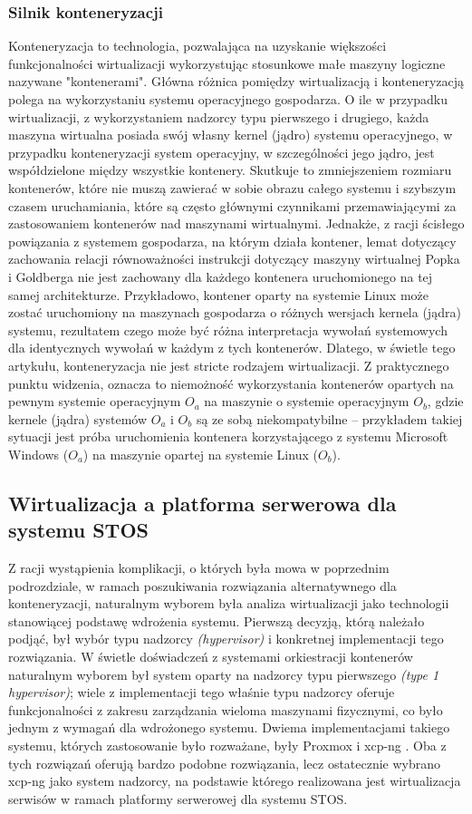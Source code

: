 \subsubsection{Silnik konteneryzacji}
Konteneryzacja to technologia, pozwalająca na uzyskanie większości funkcjonalności wirtualizacji wykorzystując stosunkowe małe maszyny logiczne nazywane "kontenerami". Główna różnica pomiędzy wirtualizacją i konteneryzacją polega na wykorzystaniu systemu operacyjnego gospodarza. O ile w przypadku wirtualizacji, z wykorzystaniem nadzorcy typu pierwszego i drugiego, każda maszyna wirtualna posiada swój własny kernel (jądro) systemu operacyjnego, w przypadku konteneryzacji system operacyjny, w szczególności jego jądro, jest współdzielone między wszystkie kontenery. Skutkuje to zmniejszeniem rozmiaru kontenerów, które nie muszą zawierać w sobie obrazu całego systemu i szybszym czasem uruchamiania, które są często głównymi czynnikami przemawiającymi za zastosowaniem kontenerów nad maszynami wirtualnymi. Jednakże, z racji ścisłego powiązania z systemem gospodarza, na którym działa kontener, lemat dotyczący zachowania relacji równoważności instrukcji dotyczący maszyny wirtualnej Popka i Goldberga \cite{virtualization} nie jest zachowany dla każdego kontenera uruchomionego na tej samej architekturze. Przykładowo, kontener oparty na systemie Linux może zostać uruchomiony na maszynach gospodarza o różnych wersjach kernela (jądra) systemu, rezultatem czego może być różna interpretacja wywołań systemowych dla identycznych wywołań w każdym z tych kontenerów. Dlatego, w świetle tego artykułu, konteneryzacja nie jest stricte rodzajem wirtualizacji. Z praktycznego punktu widzenia, oznacza to niemożność wykorzystania kontenerów opartych na pewnym systemie operacyjnym $O_a$ na maszynie o systemie operacyjnym $O_b$, gdzie kernele (jądra) systemów $O_a$ i $O_b$ są ze sobą niekompatybilne -- przykładem takiej sytuacji jest próba uruchomienia kontenera korzystającego z systemu Microsoft Windows ($O_a$) na maszynie opartej na systemie Linux ($O_b$).

\subsection{Wirtualizacja a platforma serwerowa dla systemu STOS}
Z racji wystąpienia komplikacji, o których była mowa w poprzednim podrozdziale, w ramach poszukiwania rozwiązania alternatywnego dla konteneryzacji, naturalnym wyborem była analiza wirtualizacji jako technologii stanowiącej podstawę wdrożenia systemu. Pierwszą decyzją, którą należało podjąć, był wybór typu nadzorcy \textit{(hypervisor)} i konkretnej implementacji tego rozwiązania. W świetle doświadczeń z systemami orkiestracji kontenerów naturalnym wyborem był system oparty na nadzorcy typu pierwszego \textit{(type 1 hypervisor)}; wiele z implementacji tego właśnie typu nadzorcy oferuje funkcjonalności z zakresu zarządzania wieloma maszynami fizycznymi, co było jednym z wymagań dla wdrożonego systemu. Dwiema implementacjami takiego systemu, których zastosowanie było rozważane, były Proxmox i xcp-ng \cite{proxmox, xcp}. Oba z tych rozwiązań oferują bardzo podobne rozwiązania, lecz ostatecznie wybrano xcp-ng jako system nadzorcy, na podstawie którego realizowana jest wirtualizacja serwisów w ramach platformy serwerowej dla systemu STOS.

